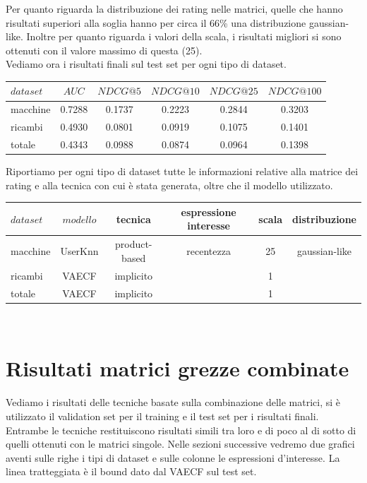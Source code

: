Per quanto riguarda la distribuzione dei rating nelle matrici, quelle che hanno risultati superiori alla soglia hanno per circa il 66\% una distribuzione gaussian-like. Inoltre per quanto riguarda i valori della scala, i risultati migliori si sono ottenuti con il valore massimo di questa (25).\\
Vediamo ora i risultati finali sul test set per ogni tipo di dataset.\\
\begin{center}
    \begin{tabular}{|l|ccccc|}
        \toprule
        $dataset$  & $AUC$ & $NDCG@5$ & $NDCG@10$  & $NDCG@25$ & $NDCG@100$  \\
        \midrule
        macchine & 0.7288 & 0.1737 & 0.2223 & 0.2844 & 0.3203 \\
        ricambi  & 0.4930 &  0.0801 &    0.0919 &  0.1075 & 0.1401 \\
        totale  & 0.4343 &   0.0988  &  0.0874 &  0.0964 & 0.1398 \\
    \bottomrule
    \end{tabular}
    \label{tab:risultati_finali}
\end{center}
Riportiamo per ogni tipo di dataset tutte le informazioni relative alla matrice dei rating e alla tecnica con cui è stata generata, oltre che il modello utilizzato.\\

\begin{tabular}{|l|ccccc|}
    \toprule
    $dataset$  & $modello$ & tecnica &espressione interesse & scala & distribuzione  \\
    \midrule
    macchine & UserKnn& product-based &recentezza & 25 & gaussian-like   \\
    ricambi & VAECF& implicito &  & 1  &    \\
    totale & VAECF& implicito &  &  1 &     \\

\bottomrule
\end{tabular}\\

\newpage
\section{Risultati matrici grezze combinate}
Vediamo i risultati delle tecniche basate sulla combinazione delle matrici, si è utilizzato il validation set per il training e il test set per i risultati finali.
Entrambe le tecniche restituiscono risultati simili tra loro e di poco al di sotto di quelli ottenuti con le matrici singole. Nelle sezioni successive vedremo due grafici aventi sulle righe i tipi di dataset e sulle colonne le espressioni d'interesse. La linea tratteggiata è il bound dato dal VAECF sul test set.

